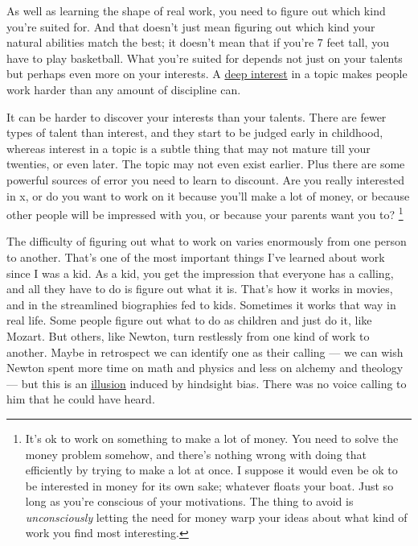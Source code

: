 \documentclass[12pt]{book}
\begin{document}
As well as learning the shape of real work, you need to figure out which
kind you're suited for. And that doesn't just mean figuring out which
kind your natural abilities match the best; it doesn't mean that if
you're 7 feet tall, you have to play basketball. What you're suited for
depends not just on your talents but perhaps even more on your
interests. A \href{genius.html}{deep interest} in a topic makes people
work harder than any amount of discipline can.

It can be harder to discover your interests than your talents. There are
fewer types of talent than interest, and they start to be judged early
in childhood, whereas interest in a topic is a subtle thing that may not
mature till your twenties, or even later. The topic may not even exist
earlier. Plus there are some powerful sources of error you need to learn
to discount. Are you really interested in x, or do you want to work on
it because you'll make a lot of money, or because other people will be
impressed with you, or because your parents want you to?
\footnote{It's ok to work on something to make a lot of money. You need to
solve the money problem somehow, and there's nothing wrong with doing
that efficiently by trying to make a lot at once. I suppose it would
even be ok to be interested in money for its own sake; whatever floats
your boat. Just so long as you're conscious of your motivations. The
thing to avoid is \emph{unconsciously} letting the need for money warp
your ideas about what kind of work you find most interesting.}

The difficulty of figuring out what to work on varies enormously from
one person to another. That's one of the most important things I've
learned about work since I was a kid. As a kid, you get the impression
that everyone has a calling, and all they have to do is figure out what
it is. That's how it works in movies, and in the streamlined biographies
fed to kids. Sometimes it works that way in real life. Some people
figure out what to do as children and just do it, like Mozart. But
others, like Newton, turn restlessly from one kind of work to another.
Maybe in retrospect we can identify one as their calling --- we can wish
Newton spent more time on math and physics and less on alchemy and
theology --- but this is an \href{disc.html}{illusion} induced by
hindsight bias. There was no voice calling to him that he could have
heard.
\end{document}

